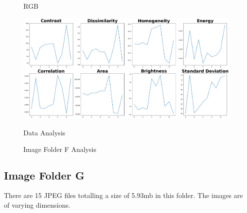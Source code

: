 \begin{figure}[ht]
\begin{minipage}[t]{0.25\textwidth}
        \caption*{RGB}
    \end{minipage}\hfill
    \begin{minipage}[t]{0.50\textwidth}
        \centering
        \includegraphics[width=\textwidth]{Figures/EDA_Charts/7/da.png}
        \caption*{Data Analysis}
    \end{minipage}
    \caption{Image Folder F Analysis}
    \label{fig:Image Folder F Analysis}
\end{figure}

\newpage

\subsection{Image Folder G}

There are 15 JPEG files totalling a size of 5.93mb in this folder. The images are of varying dimensions.



